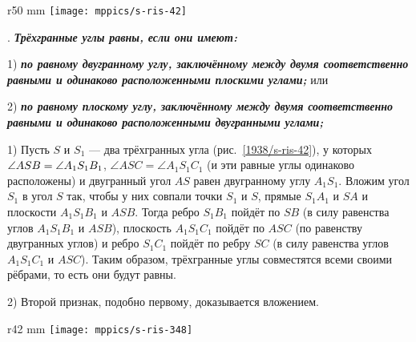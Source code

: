 \begin{wrapfigure}[10]{r}{50 mm}
\vskip-6mm
\centering
\texttt{[image: mppics/s-ris-42]}
\caption{}\label{1938/s-ris-42}
\end{wrapfigure}

\medskip

\mbox{}.
\textbf{\emph{Трёхгранные углы равны, если они имеют:}}

1) \textbf{\emph{по равному двугранному углу, заключённому между двумя соответственно равными и одинаково расположенными плоскими углами;}} или

2) \textbf{\emph{по равному плоскому углу, заключённому между двумя соответственно равными и одинаково расположенными двугранными углами;}} 

1) Пусть $S$ и $S_1$ — два трёхгранных угла (рис.~\ref{1938/s-ris-42}), у которых $\angle ASB\z=\angle A_1S_1B_1$,
$\angle ASC= \angle A_1S_1C_1$ (и эти равные углы одинаково расположены) и двугранный угол $AS$ равен двугранному углу $A_1S_1$.
Вложим угол $S_1$ в угол $S$ так, чтобы у них совпали точки $S_1$ и $S$, прямые $S_1A_1$ и $SA$ и плоскости $A_1S_1B_1$ и $ASB$.
Тогда ребро $S_1B_1$ пойдёт по $SB$ (в силу равенства углов $A_1S_1B_1$ и $ASB$), плоскость $A_1S_1C_1$ пойдёт по $ASC$ (по равенству двугранных углов) и ребро $S_1C_1$ пойдёт по ребру $SC$ (в силу равенства углов $A_1S_1C_1$ и $ASC$).
Таким образом, трёхгранные углы совместятся всеми своими рёбрами, то есть они будут равны.

2) Второй признак, подобно первому, доказывается вложением.

\begin{wrapfigure}{r}{42 mm}
\vskip0mm
\centering
\texttt{[image: mppics/s-ris-348]}
\caption{}\label{1914/s-ris-348}
\end{wrapfigure}

